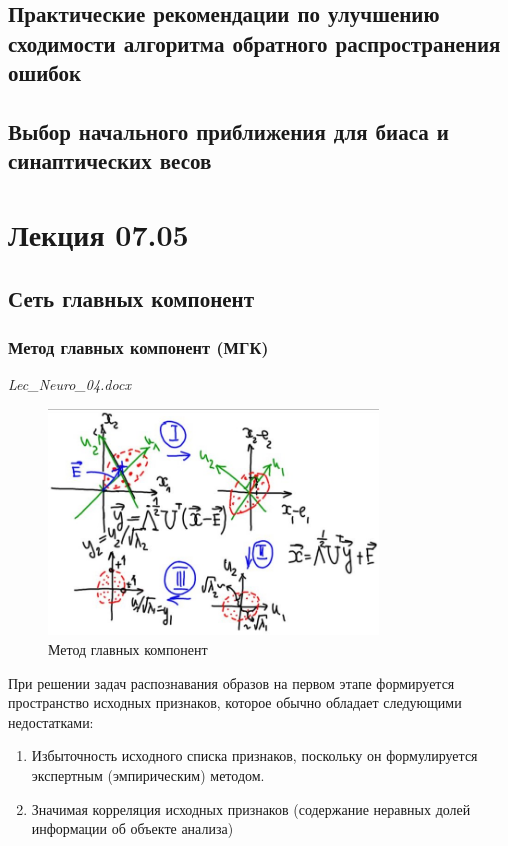 \documentclass{article}
\numberwithin{equation}{subsection}
\begin{document}
\subsection{Практические рекомендации по улучшению сходимости алгоритма обратного распространения ошибок}


\subsection{Выбор начального приближения для биаса и синаптических весов}




\section{Лекция 07.05}

\subsection{Сеть главных компонент}

\subsubsection{Метод главных компонент (МГК)}

\begin{myquote}
    \textit{Lec\_Neuro\_04.docx}
\end{myquote}

\begin{figure}[htbp]
    \centering
    \includegraphics[height=6cm]{hyperflat_11_1.jpeg}
    \caption{Метод главных компонент}
    \label{hyperflat_11_1}
\end{figure}

При решении задач распознавания образов на первом этапе формируется пространство 
исходных признаков, которое обычно обладает  следующими недостатками:

\begin{enumerate}
    \item Избыточность исходного списка признаков, поскольку он формулируется экспертным 
    (эмпирическим) методом.
    \item Значимая корреляция исходных признаков (содержание неравных долей информации
    об объекте анализа)
\end{enumerate}
\end{document}
